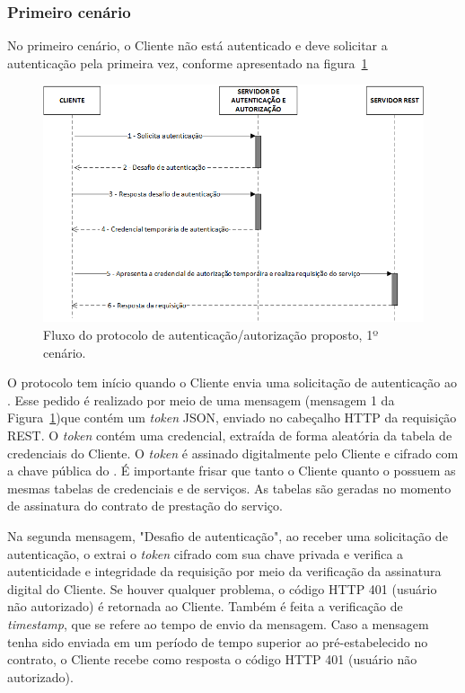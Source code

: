 \subsubsection{Primeiro cenário}

No primeiro cenário, o Cliente não está autenticado e deve solicitar a autenticação pela primeira vez, conforme apresentado na figura~\ref{fig:protocoloseguro}

\begin{figure}[!htb]
    \centering
    \includegraphics[width=1.0\textwidth]{fluxo_autenticacao.png}
    \caption{Fluxo do protocolo de autenticação/autorização proposto, 1º cenário.}
    \label{fig:protocoloseguro}
\end{figure}


O protocolo tem início quando o Cliente envia uma solicitação de autenticação ao \servidorAA.
Esse pedido é realizado por meio de uma mensagem (mensagem 1 da Figura~\ref{fig:protocoloseguro})que contém um \emph{token} JSON, enviado no cabeçalho HTTP da requisição REST. O \emph{token} contém uma credencial, extraída de forma aleatória da tabela de credenciais do Cliente. O \emph{token} é assinado digitalmente pelo Cliente e cifrado com a chave pública do \servidorAA. É importante frisar que tanto o Cliente quanto o \servidorAA{} possuem as mesmas tabelas de credenciais e de serviços. As tabelas são geradas no momento de assinatura do contrato de prestação do serviço.

Na segunda mensagem, "Desafio de autenticação", ao receber uma solicitação de autenticação, o \servidorAA{} extrai o \emph{token} cifrado com sua chave privada e verifica a autenticidade e integridade da requisição por meio da verificação da assinatura digital do Cliente. Se houver qualquer problema, o código HTTP 401 (usuário não autorizado) é retornada ao Cliente.
Também é feita a verificação de \emph{timestamp}, que se refere ao tempo de envio da mensagem. Caso a mensagem tenha
sido enviada em um período de tempo superior ao pré-estabelecido no contrato, o Cliente recebe como resposta o código HTTP 401 (usuário não autorizado).


